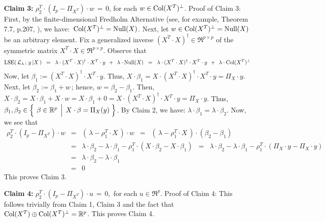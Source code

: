 \vskip 0.5cm
\noindent
\textbf{Claim 3:}\quad
$\rho_{2}^{T} \cdot (I_{p} - \Pi_{X^{T}}) \cdot w \,=\, 0$,
for each $w \in \textnormal{Col}(X^{T})^{\perp}$.
\vskip 0.2cm
\noindent
Proof of Claim 3:\quad
First, by the finite-dimensional Fredholm Alternative (see, for example, Theorem 7.7, p.207, \cite{Axler2015}),
we have: \,$\textnormal{Col}(X^{T})^{\perp} = \textnormal{Null}(X)$.
Next, let $w \in \textnormal{Col}(X^{T})^{\perp} = \textnormal{Null}(X)$ be an arbitrary element.
Fix a generalized inverse $(X^{T} \cdot X)^{\dagger} \in \Re^{p \times p}$
of the symmetric matrix $X^{T} \cdot X \in \Re^{p \times p}$.
Observe that
\begin{equation*}
\textnormal{LSE}\!\left(\,\mathcal{L}_{\lambda}\,;\,y\,\vert X\,\right)
\;\; = \;\;
	\lambda \cdot (X^{T} \cdot X)^{\dagger} \cdot X^{T} \cdot y \;\, + \;\, \lambda \cdot \textnormal{Null}(X)
\;\; = \;\;
	\lambda \cdot (X^{T} \cdot X)^{\dagger} \cdot X^{T} \cdot y \;\, + \;\, \lambda \cdot \textnormal{Col}(X^{T})^{\perp}
\end{equation*}
Now, let $\beta_{1} := (X^{T} \cdot X)^{\dagger} \cdot X^{T} \cdot y$.
Thus, $X\cdot\beta_{1} = X \cdot (X^{T} \cdot X)^{\dagger} \cdot X^{T} \cdot y = \Pi_{X}\cdot y$.
Next, let $\beta_{2} := \beta_{1} + w$\,; hence, $w = \beta_{2} - \beta_{1}$.
Then, $X\cdot\beta_{2} = X\cdot\beta_{1} + X\cdot w = X\cdot\beta_{1} + 0 = X \cdot (X^{T} \cdot X)^{\dagger} \cdot X^{T} \cdot y = \Pi_{X}\cdot y$.
Thus, $\beta_{1}, \beta_{2} \in \left\{\;\left.\overset{{\color{white}.}}{\beta} \in \Re^{p} \;\,\right\vert\; X\cdot\beta=\Pi_{X}(y) \;\right\}$.
By Claim 2, we have: $\lambda\cdot\beta_{1} = \lambda\cdot\beta_{2}$.
Now, we see that
\begin{eqnarray*}
\rho_{2}^{T} \cdot (I_{p} - \Pi_{X^{T}}) \cdot w
&=&
	\left(\, \lambda - \rho_{1}^{T} \cdot X \,\right) \cdot w
\;\; = \;\;
	\left(\, \lambda - \rho_{1}^{T} \cdot X \,\right) \cdot (\beta_{2} - \beta_{1})
\\
&=&
	\lambda\cdot\beta_{2} - \lambda\cdot\beta_{1} - \rho_{1}^{T} \cdot (X \cdot \beta_{2} - X \cdot \beta_{1})
\;\; = \;\;
	\lambda\cdot\beta_{2} - \lambda\cdot\beta_{1} - \rho_{1}^{T} \cdot (\Pi_{X}\cdot y - \Pi_{X}\cdot y)
\\
&=&
	\lambda\cdot\beta_{2} - \lambda\cdot\beta_{1}
\\
&=&
	0
\end{eqnarray*}
This proves Claim 3.

\vskip 0.5cm
\noindent
\textbf{Claim 4:}\quad
$\rho_{2}^{T} \cdot (I_{p} - \Pi_{X^{T}}) \cdot u \,=\, 0$,\, for each $u \in \Re^{p}$.
\vskip 0.2cm
\noindent
Proof of Claim 4:\quad
This follows trivially from Claim 1, Claim 3 and the fact that
$\textnormal{Col}(X^{T}) \oplus \textnormal{Col}(X^{T})^{\perp} = \mathbb{R}^{p}$.
This proves Claim 4.

